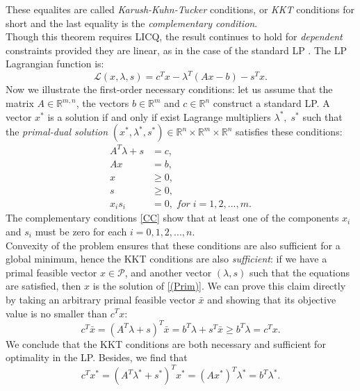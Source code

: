 \documentclass[a4paper,10 pt,titlepage,twoside]{book}
\theoremstyle{plain}
\theoremstyle{definition}
\theoremstyle{remark}
\begin{document}
These equalites are called \textit{Karush-Kuhn-Tucker} conditions, or \textit{KKT} conditions for short and the last equality is the \textit{complementary condition}.\\ Though this theorem requires LICQ, the result continues to hold for \textit{dependent} constraints provided they are linear, as in the case of the standard LP \cite{W}. The LP Lagrangian function is:\\
\begin{equation}\label{Lagrangian}
\mathcal{L}(x,\lambda,s)=c^{T}x-\lambda^{T}\left(Ax-b\right)-s^{T}x.
\end{equation}
Now we illustrate the first-order necessary conditions: let us assume that the matrix $A\in\mathbb{R}^{m,n}$, the vectors $b\in\mathbb{R}^{m}$ and $c\in\mathbb{R}^{n}$ construct a standard LP. A vector $x^{*}$ is a solution if and only if exist Lagrange multipliers $\lambda^{*},\;s^{*}$ such that the \textit{primal-dual solution} $\left( x^{*},\lambda^{*},s^{*}\right)\in\mathbb{R}^{n}\times\mathbb{R}^{m}\times\mathbb{R}^{n}$ satisfies these conditions: 
\begin{align}
A^{T}\lambda+s&=c,\tag{2.5a}\\ \label{DF}
Ax&=b,\tag{2.5b}\\ \label{PF}
x&\geq 0,\tag{2.5c}\\
s&\geq 0,\tag{2.5d}\\
x_{i}s_{i}&=0,\; for\;i= 1,2,...,m.\label{CC} \tag{2.5e}
\end{align} 
The complementary conditions \ref{CC} show that at least one of the components $x_{i}$ and $s_{i}$ must be zero for each $i=0,1,2,...,n$.\\
 Convexity of the problem ensures that these conditions are also sufficient for a global minimum, hence the KKT conditions are also \textit{sufficient}: if we have a primal feasible vector $x\in\mathcal{P}$, and another vector $(\lambda, s)$ such that the equations are satisfied, then $x$ is the solution of \ref{(Prim)}. We can prove this claim directly by taking an arbitrary primal feasible vector $\bar{x}$ and showing that its objective value is no smaller than $c^{T}x$:
\begin{equation*}
c^{T}\bar{x}=(A^{T}\lambda+s)^{T}\bar{x}=b^{T}\lambda+s^{T}\bar{x}\geq b^{T}\lambda= c^{T}x.
\end{equation*}
We conclude that the KKT conditions are both necessary and sufficient for optimality in the LP. Besides, we find that
\begin{equation*}
	c^{T}x^{*}=\left(A^{T}\lambda^{*}+s^{*}\right)^{T}x^{*}=\left(Ax^{*}\right)^{T}\lambda^{*}=b^{T}\lambda^{*}.
\end{equation*}
\end{document}
